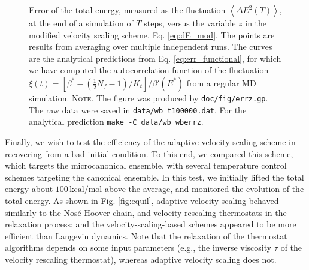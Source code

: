 \documentclass[reprint]{revtex4-1}
\newcommand{\note}[1]{{\color{DarkGreen}\footnotesize \textsc{Note.} #1}}
\begin{document}
\begin{figure}[h]
\begin{center}
  \caption{
    \label{fig:errz}
    Error of the total energy,
    measured as the fluctuation
    $\left\langle \Delta E^2(T) \right\rangle$,
    at the end of a simulation of $T$ steps,
    versus the variable $z$
    in the modified velocity scaling scheme,
    Eq. \eqref{eq:dE_mod}.
    The points are results from averaging over
    multiple independent runs.
    The curves are the analytical predictions from
    Eq. \eqref{eq:err_functional},
    for which we have computed the autocorrelation function
    of the fluctuation
    $\xi(t) = \left[\beta^* - \left(\frac 1 2 N_f-1\right)/K_t\right]/\beta'(E^*)$
    from a regular MD simulation.
    \note{The figure was produced by \texttt{doc/fig/errz.gp}.
      The raw data were saved in \texttt{data/wb\_t100000.dat}.
      For the analytical prediction \texttt{make -C data/wb wberrz}.
    }%
  }
\end{center}
\end{figure}



Finally, we wish to test
the efficiency of the adaptive velocity scaling scheme
in recovering from a bad initial condition.
%
To this end,
we compared this scheme,
which targets the microcanonical ensemble,
with several temperature control schemes
targeting the canonical ensemble.
%
In this test, we initially lifted the total energy about
$100\,\mathrm{kcal/mol}$ above the average,
and monitored the evolution of the total energy.
%
As shown in Fig. \ref{fig:equil},
adaptive velocity scaling
behaved similarly to
the Nos\'e-Hoover chain\cite{nose1984, nose1984mp, hoover1985, martyna1992},
and velocity rescaling\cite{bussi2007}
thermostats
in the relaxation process;
and the velocity-scaling-based schemes
appeared to be more efficient than Langevin dynamics.
%
Note that the relaxation
of the thermostat algorithms
depends on some input parameters
(e.g., the inverse viscosity $\tau$ of the velocity rescaling thermostat),
whereas adaptive velocity scaling does not.
\end{document}
